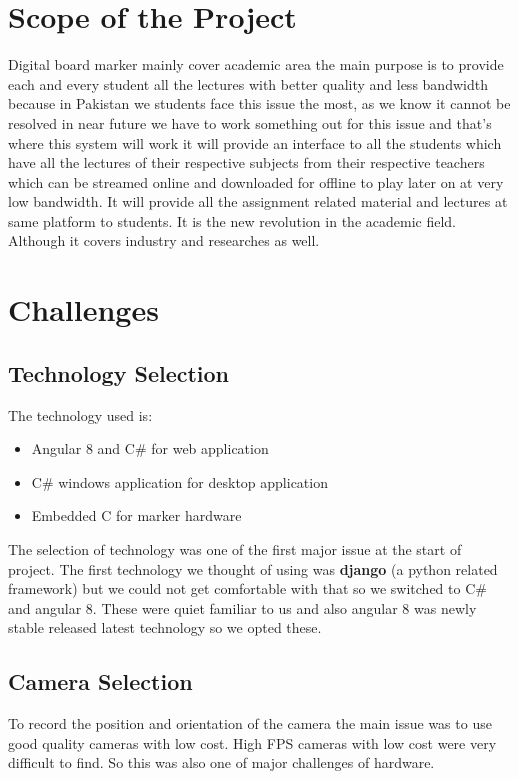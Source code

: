\section{Scope of the Project}
Digital board marker mainly cover academic area the main purpose is to provide each and every student all the lectures with better quality and less bandwidth because in Pakistan we students face this issue the most, as we know it cannot be resolved in near future we have to work something out for this issue and that’s where this system will work it will provide an interface to all the students which have all the lectures of their respective subjects from their respective teachers which can be streamed online and downloaded for offline to play later on at very low bandwidth. It will provide all the assignment related material and lectures at same platform to students. It is the new revolution in the academic field. Although it covers industry and researches as well.
\bigskip

\section{Challenges}
\subsection{Technology Selection}
The technology used is:
\begin{itemize}

\item Angular 8 and C\# for web application
\item C\# windows application for desktop application
\item Embedded C for marker hardware

\end{itemize}

The selection of technology was one of the first major issue at the start of project. The first technology we thought of using was \textbf{django} (a python related framework) but we could not get comfortable with that so we switched to C\# and angular 8. These were quiet familiar to us and also angular 8 was newly stable released latest technology so we opted these.
\bigskip


\subsection{Camera Selection}
To record the position and orientation of the camera the main issue was to use good quality cameras with low cost. High FPS cameras with low cost were very difficult to find. So this was also one of major challenges of hardware.
\bigskip


